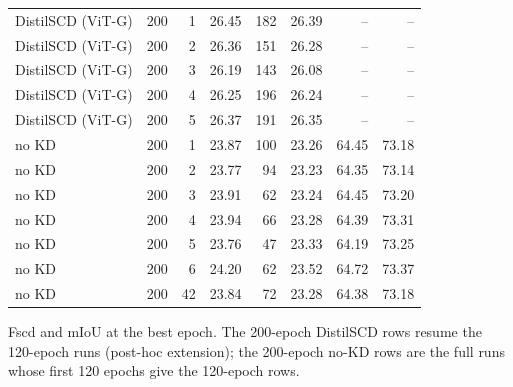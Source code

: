\begin{table}[!t]
\begin{tabular}{lrrrrrrr}
DistilSCD (ViT-G) & 200 & 1 & 26.45 & 182 & 26.39 & -- & -- \\
DistilSCD (ViT-G) & 200 & 2 & 26.36 & 151 & 26.28 & -- & -- \\
DistilSCD (ViT-G) & 200 & 3 & 26.19 & 143 & 26.08 & -- & -- \\
DistilSCD (ViT-G) & 200 & 4 & 26.25 & 196 & 26.24 & -- & -- \\
DistilSCD (ViT-G) & 200 & 5 & 26.37 & 191 & 26.35 & -- & -- \\
no KD & 200 & 1 & 23.87 & 100 & 23.26 & 64.45 & 73.18 \\
no KD & 200 & 2 & 23.77 & 94 & 23.23 & 64.35 & 73.14 \\
no KD & 200 & 3 & 23.91 & 62 & 23.24 & 64.45 & 73.20 \\
no KD & 200 & 4 & 23.94 & 66 & 23.28 & 64.39 & 73.31 \\
no KD & 200 & 5 & 23.76 & 47 & 23.33 & 64.19 & 73.25 \\
no KD & 200 & 6 & 24.20 & 62 & 23.52 & 64.72 & 73.37 \\
no KD & 200 & 42 & 23.84 & 72 & 23.28 & 64.38 & 73.18 \\
\bottomrule
\end{tabular}
\par\smallskip\parbox{\linewidth}{\scriptsize Fscd and mIoU at the best epoch. The 200-epoch DistilSCD rows resume the 120-epoch runs (post-hoc extension); the 200-epoch no-KD rows are the full runs whose first 120 epochs give the 120-epoch rows.}
\end{table}

